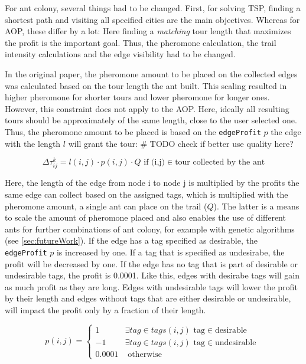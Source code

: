 For ant colony, several things had to be changed. 
First, for solving TSP, finding a shortest path and visiting all specified cities are the main objectives.
Whereas for AOP, these differ by a lot:
Here finding a \textit{matching} tour length that maximizes the profit is the important goal. 
Thus, the pheromone calculation, the trail intensity calculations and the edge visibility had to be changed.


In the original paper, the pheromone amount to be placed on the collected edges was calculated based on the tour length the ant built. 
This scaling resulted in higher pheromone for shorter tours and lower pheromone for longer ones.
However, this constraint does not apply to the AOP.
Here, ideally all resulting tours should be approximately of the same length, close to the user selected one.
Thus, the pheromone amount to be placed is based on the \texttt{edgeProfit} $p$ the edge with the length $l$ will grant the tour:
\# TODO check if better use quality here?

\begin{equation}
	\label{eq:newPheromoneCalc}
	\Delta\tau_{ij}^k = l(i,j) \cdot p(i,j) \cdot Q \text{ if (i,j)} \in \text{tour collected by the ant}
\end{equation}

Here, the length of the edge from node i to node j is multiplied by the profits the same edge can collect based on the assigned tags, which is multiplied with the pheromone amount, a single ant can place on the trail ($Q$).
The latter is a means to scale the amount of pheromone placed and also enables the use of different ants for further combinations of ant colony, for example with genetic algorithms (see \ref{sec:futureWork}).
If the edge has a tag specified as desirable, the \texttt{edgeProfit} $p$ is increased by one.
If a tag that is specified as undesirabe, the profit will be decreased by one.
If the edge has no tag that is part of desirable or undesirable tags, the profit is 0.0001.
Like this, edges with desirabe tags will gain as much profit as they are long. 
Edges with undesirable tags will lower the profit by their length and edges without tags that are either desirable or undesirable, will impact the profit only by a fraction of their length.

\begin{equation}
	\label{eq:newProfitCalc}
	p(i,j) = \begin{cases}
		1 &\exists tag \in tags(i,j) \text{ tag} \in \text{desirable }\\
		-1 &\exists tag \in tags(i,j) \text{ tag} \in \text{undesirable }\\
		0.0001 &\text{ otherwise}
	\end{cases}
\end{equation}


